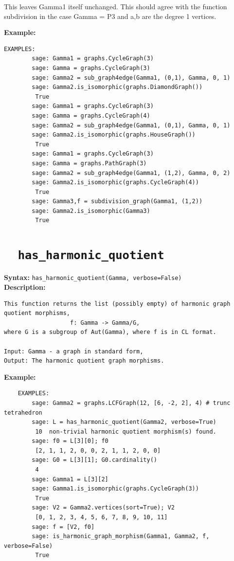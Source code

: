 \documentclass{article}
\begin{document}
    This leaves Gamma1 itself unchanged. This should agree with the function
    subdivision in the case Gamma = P3 and a,b are the degree 1 vertices.

\textbf{Example:}
\begin{verbatim}
EXAMPLES:
        sage: Gamma1 = graphs.CycleGraph(3)    
        sage: Gamma = graphs.CycleGraph(3)     
        sage: Gamma2 = sub_graph4edge(Gamma1, (0,1), Gamma, 0, 1) 
        sage: Gamma2.is_isomorphic(graphs.DiamondGraph())
         True
        sage: Gamma1 = graphs.CycleGraph(3)    
        sage: Gamma = graphs.CycleGraph(4)     
        sage: Gamma2 = sub_graph4edge(Gamma1, (0,1), Gamma, 0, 1)
        sage: Gamma2.is_isomorphic(graphs.HouseGraph()) 
         True
        sage: Gamma1 = graphs.CycleGraph(3)    
        sage: Gamma = graphs.PathGraph(3)     
        sage: Gamma2 = sub_graph4edge(Gamma1, (1,2), Gamma, 0, 2) 
        sage: Gamma2.is_isomorphic(graphs.CycleGraph(4))  
         True
        sage: Gamma3,f = subdivision_graph(Gamma1, (1,2)) 
        sage: Gamma2.is_isomorphic(Gamma3)     
         True
\end{verbatim}

\section{\tt \ \ has\_harmonic\_quotient}

\textbf{Syntax:} \verb}has_harmonic_quotient(Gamma, verbose=False)}\\

\textbf{Description:}
\begin{verbatim}
This function returns the list (possibly empty) of harmonic graph quotient morphisms, 
                   f: Gamma -> Gamma/G,
where G is a subgroup of Aut(Gamma), where f is in CL format.

Input: Gamma - a graph in standard form,
Output: The harmonic quotient graph morphisms.
\end{verbatim}

\textbf{Example:}
\begin{verbatim}
    EXAMPLES:
        sage: Gamma2 = graphs.LCFGraph(12, [6, -2, 2], 4) # trunc tetrahedron
        sage: L = has_harmonic_quotient(Gamma2, verbose=True)  
         10  non-trivial harmonic quotient morphism(s) found.
        sage: f0 = L[3][0]; f0     
         [2, 1, 1, 2, 0, 0, 2, 1, 1, 2, 0, 0]
        sage: G0 = L[3][1]; G0.cardinality()            
         4
        sage: Gamma1 = L[3][2]   
        sage: Gamma1.is_isomorphic(graphs.CycleGraph(3))    
         True
        sage: V2 = Gamma2.vertices(sort=True); V2 
         [0, 1, 2, 3, 4, 5, 6, 7, 8, 9, 10, 11]
        sage: f = [V2, f0]   
        sage: is_harmonic_graph_morphism(Gamma1, Gamma2, f, verbose=False)   
         True
\end{verbatim}
\end{document}

